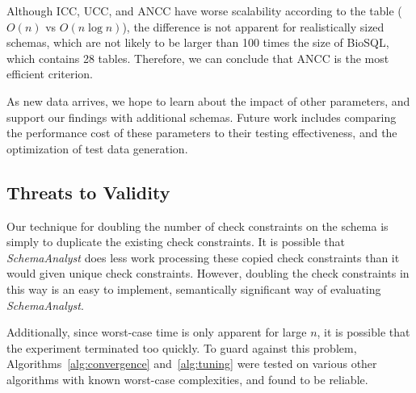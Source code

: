 Although ICC, UCC, and ANCC have worse scalability according to the
table ($O(n)$ vs $O(n\log n)$), the difference is not apparent for
realistically sized schemas, which are not likely to
be larger than 100 times the size of BioSQL, which contains 28 tables.
Therefore, we can conclude that ANCC is the most efficient criterion.  

As new data arrives, we hope to learn about the impact of other
parameters, and support our findings with additional schemas. 
Future work includes comparing the performance cost of these
parameters to their testing effectiveness, and the optimization of test data generation.
\subsection*{Threats to Validity}

Our technique for doubling the number of check constraints on the schema
is simply to duplicate the existing check constraints. It is possible
that \textit{SchemaAnalyst} does less work processing these copied check
constraints than it would given unique check constraints. However,
doubling the check constraints in this way is an easy to implement,
semantically significant way of evaluating \textit{SchemaAnalyst}.

Additionally, since worst-case time is only apparent for large $n$, 
it is possible that the experiment terminated too quickly.  To guard 
against this problem, Algorithms~\ref{alg:convergence} and~\ref{alg:tuning}
were tested on various other algorithms with known worst-case complexities, and 
found to be reliable.
